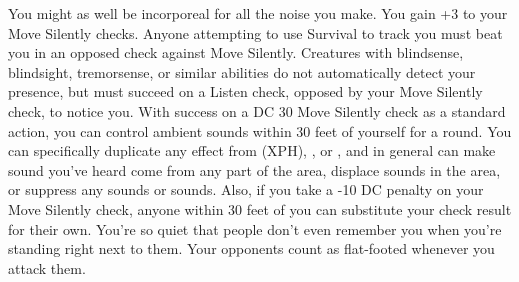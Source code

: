 {You might as well be incorporeal for all the noise you make.}
{You gain +3 to your Move Silently checks.}
{Anyone attempting to use Survival to track you must beat you in an opposed check against Move Silently.}
{Creatures with blindsense, blindsight, tremorsense, or similar abilities do not automatically detect your presence, but must succeed on a Listen check, opposed by your Move Silently check, to notice you.}
{With success on a DC 30 Move Silently check as a standard action, you can control ambient sounds within 30 feet of yourself for a round. You can specifically duplicate any effect from  (XPH), , or , and in general can make sound you've heard come from any part of the area, displace sounds in the area, or suppress any sounds or sounds. Also, if you take a -10 DC penalty on your Move Silently check, anyone within 30 feet of you can substitute your check result for their own.}
{You're so quiet that people don't even remember you when you're standing right next to them. Your opponents count as flat-footed whenever you attack them.}